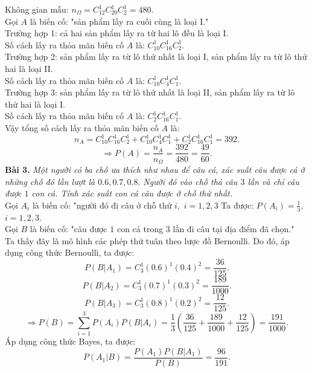 \documentclass[12pt,a4paper]{article}
\begin{document}
Không gian mẫu: ${n_\Omega } = C_{12}^1C_{20}^1C_2^1 = 480.$\\
Gọi $A$ là biến cố: "sản phẩm lấy ra cuối cùng là loại I."\\
Trường hợp 1: cả hai sản phẩm lấy ra từ hai lô đều là loại I.\\
Số cách lấy ra thỏa mãn biến cố $A$ là: $C^1_{10} C^1_{16} C^1_{2}.$\\
Trường hợp 2: sản phẩm lấy ra từ lô thứ nhất là loại I, sản phẩm lấy ra từ lô thứ hai là loại II.\\
Số cách lấy ra thỏa mãn biến cố $A$ là: $C^1_{10} C^1_{4} C^1_{1}.$\\
Trường hợp 3: sản phẩm lấy ra từ lô thứ nhất là loại II, sản phẩm lấy ra từ lô thứ hai là loại I.\\
Số cách lấy ra thỏa mãn biến cố $A$ là: $C^1_2 C^1_{16} C^1_1.$\\
Vậy tổng số cách lấy ra thỏa mãn biến cố $A$ là: 
$${n_A} = C_{10}^1C_{16}^1C_2^1 + C_{10}^1C_4^1C_1^1 + C_2^1C_{16}^1C_1^1 = 392.$$
$$ \Rightarrow P\left( A \right) = \frac{{{n_A}}}{{{n_\Omega }}} = \frac{{392}}{{480}} = \frac{{49}}{{60}}.$$
\textbf{Bài 3.} \textit{Một người có ba chỗ ưa thích như nhau để câu cá, xác suất câu được cá ở những chỗ đó lần lượt là $0.6, 0.7, 0.8.$ Người đó vào chỗ thả câu $3$ lần và chỉ câu được $1$ con cá. Tính xác suất con cá câu được ở chỗ thứ nhất.}\\
Gọi $A_i$ là biến cố: "người đó đi câu ở chỗ thứ $i,$ $i = 1, 2, 3$ Ta được: $P \left( {A_i} \right) = \frac{1}{3},$ $i = 1, 2, 3.$\\
Gọi $B$ là biến cố: "câu được $1$ con cá trong $3$ lần đi câu tại địa điểm đã chọn."\\
Ta thấy đây là mô hình các phép thử tuân theo lược đồ Bernoulli. Do đó, áp dụng công thức Bernoulli, ta được:
$$P\left( {\left. B \right|{A_1}} \right) = C_3^1{\left( {0.6} \right)^1}{\left( {0.4} \right)^2} = \frac{{36}}{{125}}.$$
$$P\left( {\left. B \right|{A_2}} \right) = C_3^1{\left( {0.7} \right)^1}{\left( {0.3} \right)^2} = \frac{{189}}{{1000}}.$$
$$P\left( {\left. B \right|{A_3}} \right) = C_3^1{\left( {0.8} \right)^1}{\left( {0.2} \right)^2} = \frac{{12}}{{125}}.$$
$$ \Rightarrow P\left( B \right) = \sum\limits_{i = 1}^3 {P\left( {{A_i}} \right)} P\left( {\left. B \right|{A_i}} \right) = \frac{1}{3}\left( {\frac{{36}}{{125}} + \frac{{189}}{{1000}} + \frac{{12}}{{125}}} \right) = \frac{{191}}{{1000}}.$$
Áp dụng công thức Bayes, ta được:
$$P\left( {\left. {{A_1}} \right|B} \right) = \frac{{P\left( {{A_1}} \right)P\left( {\left. B \right|{A_1}} \right)}}{{P\left( B \right)}} = \frac{{96}}{{191}}.$$
\end{document}
